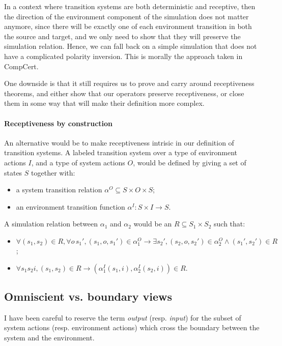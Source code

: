 \documentclass[11pt]{article}
\begin{document}
In a context where transition systems are
both deterministic and receptive,
then the direction of the environment component of the simulation
does not matter anymore,
since there will be exactly one of each environment transition
in both the source and target,
and we only need to show that they will preserve
the simulation relation.
Hence, we can fall back on a simple simulation
that does not have a complicated polarity inversion.
This is morally the approach taken in CompCert.

One downside is that it still requires us to prove and carry around
receptiveness theorems,
and either show that our operators preserve receptiveness,
or close them in some way that will make their definition more complex.

\paragraph{Receptiveness by construction}

An alternative would be to make receptiveness intrisic
in our definition of transition systems.
A labeled transition system over
a type of environment actions $I$, and
a type of system actions $O$,
would be defined by giving a set of states $S$ together with:
\begin{itemize}
\item a system transition relation $\alpha^O \subseteq S \times O \times S$;
\item an environment transition function $\alpha^I : S \times I \rightarrow S$.
\end{itemize}
A simulation relation between $\alpha_1$ and $\alpha_2$
would be an $R \subseteq S_1 \times S_2$ such that:
\begin{itemize}
\item $\forall (s_1, s_2) \in R,
  \forall o \, s_1', (s_1, o, s_1') \in \alpha_1^O \rightarrow
  \exists s_2', (s_2, o, s_2') \in \alpha_2^O \wedge (s_1', s_2') \in R$;
\item $\forall s_1 s_2 i, (s_1, s_2) \in R \rightarrow
  (\alpha^I_1(s_1, i), \alpha^I_2(s_2, i)) \in R$.
\end{itemize}



\subsection{Omniscient vs. boundary views} %

I have been careful to reserve the term \emph{output} (resp. \emph{input})
for the subset of system actions (resp. environment actions)
which cross the boundary between the system and the environment.
\end{document}

